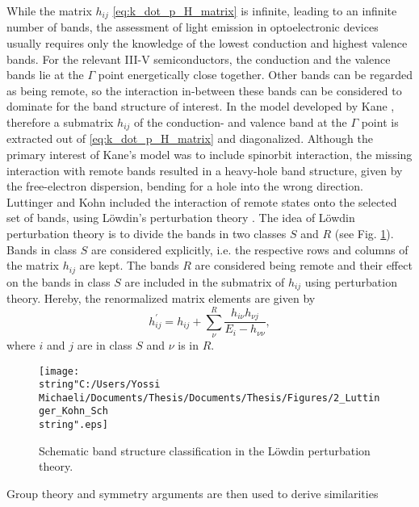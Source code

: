 While the matrix $h_{ij}$ \ref{eq:k_dot_p_H_matrix} is infinite,
leading to an infinite number of bands, the assessment of light emission
in optoelectronic devices usually requires only the knowledge of the
lowest conduction and highest valence bands. For the relevant III-V
semiconductors, the conduction and the valence bands lie at the $\Gamma$
point energetically close together. Other bands can be regarded as
being remote, so the interaction in-between these bands can be considered
to dominate for the band structure of interest. In the model developed
by Kane \citet{Kane1957}, therefore a submatrix $h_{ij}$ of the
conduction- and valence band at the $\Gamma$ point is extracted out
of \ref{eq:k_dot_p_H_matrix} and diagonalized. Although the primary
interest of Kane\textquoteright{}s model was to include spinorbit
interaction, the missing interaction with remote bands resulted in
a heavy-hole band structure, given by the free-electron dispersion,
bending for a hole into the wrong direction. Luttinger and Kohn \citet{Kohn1955a}
included the interaction of remote states onto the selected set of
bands, using L\"{o}wdin\textquoteright{}s perturbation theory \citet{Lowdin1951a}.
The idea of L\"{o}wdin perturbation theory is to divide the bands
in two classes $S$ and $R$ (see Fig. \ref{fig:Schematic-band-structure}).
Bands in class $S$ are considered explicitly, i.e. the respective
rows and columns of the matrix $h_{ij}$ are kept. The bands $R$
are considered being remote and their effect on the bands in class
$S$ are included in the submatrix of $h_{ij}$ using perturbation
theory. Hereby, the renormalized matrix elements are given by\begin{equation}
h_{ij}^{\prime}=h_{ij}+\sum_{\nu}^{R}\frac{h_{i\nu}h_{\nu j}}{E_{i}-h_{\nu\nu}},\end{equation}
where $i$ and $j$ are in class $S$ and $\nu$ is in $R$. %
\begin{figure}
\begin{centering}
\texttt{[image: \\string"C:/Users/Yossi Michaeli/Documents/Thesis/Documents/Thesis/Figures/2\_Luttinger\_Kohn\_Sch\\string".eps]}
\par\end{centering}

\caption{\label{fig:Schematic-band-structure}Schematic band structure classification
in the L\"{o}wdin perturbation theory.}



\end{figure}
 Group theory and symmetry arguments are then used to derive similarities
